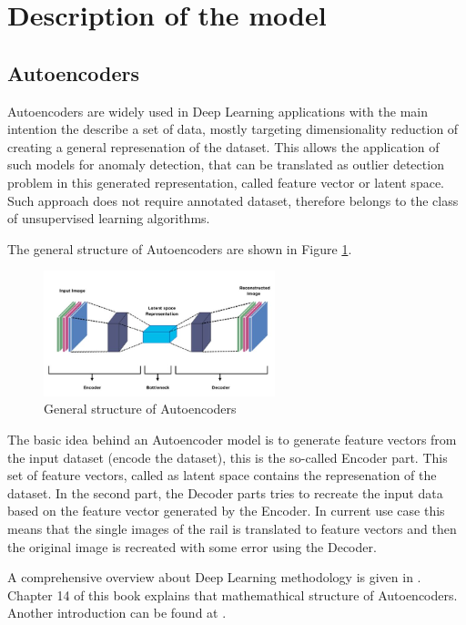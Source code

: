 \section{Description of the model} \label{model}
\subsection{Autoencoders}
Autoencoders are widely used in Deep Learning applications with the main intention
the describe a set of data, mostly targeting dimensionality reduction of creating
a general represenation of the dataset.
This allows the application of such models for anomaly detection, that can be translated
as outlier detection problem in this generated representation,
called feature vector or latent space.
Such approach does not require annotated dataset, therefore belongs to the class of
unsupervised learning algorithms.

The general structure of Autoencoders are shown in Figure \ref{fig:autoencoder}.

\begin{figure}[!ht]
    \centering
    \includegraphics[width=0.6\textwidth,trim={0 0 0 1cm},clip]{./tex_images/autoencoder.jpeg}
    \caption{General structure of Autoencoders \cite{khosla_auto_2021}}
    \label{fig:autoencoder}
\end{figure}

The basic idea behind an Autoencoder model is to generate feature vectors from the input
dataset (encode the dataset), this is the so-called Encoder part.
This set of feature vectors, called as latent space contains the represenation of the dataset.
In the second part, the Decoder parts tries to recreate the input data based on the feature vector
generated by the Encoder.
In current use case this means that the single images of the rail is translated to feature vectors
and then the original image is recreated with some error using the Decoder.

A comprehensive overview about Deep Learning methodology is given in \cite{Goodfellow-et-al-2016}.
Chapter 14 of this book explains that mathemathical structure of Autoencoders.
Another introduction can be found at \cite{_autoencoder_2023}.

